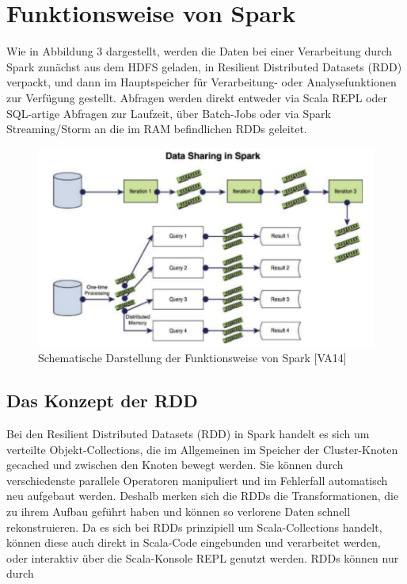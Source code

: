 \chapter{Funktionsweise von Spark}
\label{chapter:funktionsweise von Spark}



Wie in Abbildung 3 dargestellt, werden die Daten bei einer Verarbeitung durch Spark zunächst aus dem HDFS geladen, in Resilient Distributed Datasets (RDD) verpackt, und dann im Hauptspeicher für Verarbeitung- oder Analysefunktionen zur Verfügung gestellt. Abfragen werden direkt entweder via Scala REPL oder SQL-artige Abfragen zur Laufzeit, über Batch-Jobs oder via Spark Streaming/Storm an die im RAM befindlichen RDDs geleitet.

\begin{figure}[htb!]
\centering
\includegraphics[width=1.0\textwidth]{bilder/3_spark.png}
\caption{Schematische Darstellung der Funktionsweise von Spark [VA14]}
\label{fig:sparkfunkt}
\end{figure}
  
\section{Das Konzept der RDD}
\label{section:rdd}



Bei den Resilient Distributed Datasets (RDD) in Spark handelt es sich um verteilte Objekt-Collections, die im Allgemeinen im Speicher der Cluster-Knoten gecached  und zwischen den Knoten bewegt werden. Sie können durch verschiedenste parallele Operatoren manipuliert und im Fehlerfall automatisch neu aufgebaut werden. Deshalb merken sich die RDDs die Transformationen, die zu ihrem Aufbau geführt haben und können so verlorene Daten schnell rekonstruieren. Da es sich bei RDDs prinzipiell um Scala-Collections handelt, können diese auch direkt in Scala-Code eingebunden und verarbeitet werden, oder interaktiv über die Scala-Konsole REPL genutzt werden. RDDs können nur durch 




